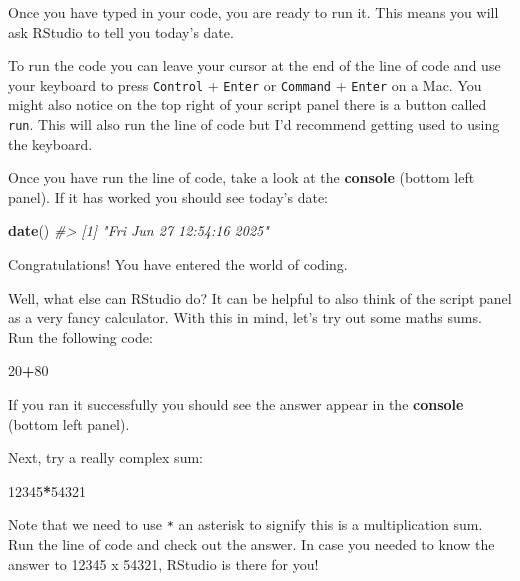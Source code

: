 \documentclass[
]{book}
\newenvironment{Shaded}{\begin{snugshade}}{\end{snugshade}}
\newcommand{\CommentTok}[1]{\textcolor[rgb]{0.56,0.35,0.01}{\textit{#1}}}
\newcommand{\DecValTok}[1]{\textcolor[rgb]{0.00,0.00,0.81}{#1}}
\newcommand{\FunctionTok}[1]{\textcolor[rgb]{0.13,0.29,0.53}{\textbf{#1}}}
\newcommand{\NormalTok}[1]{#1}
\newcommand{\SpecialCharTok}[1]{\textcolor[rgb]{0.81,0.36,0.00}{\textbf{#1}}}
\begin{document}
Once you have typed in your code, you are ready to run it. This means you will ask RStudio to tell you today's date.

To run the code you can leave your cursor at the end of the line of code and use your keyboard to press \texttt{Control} + \texttt{Enter} or \texttt{Command} + \texttt{Enter} on a Mac. You might also notice on the top right of your script panel there is a button called \texttt{run}. This will also run the line of code but I'd recommend getting used to using the keyboard.

\newpage

Once you have run the line of code, take a look at the \textbf{console} (bottom left panel). If it has worked you should see today's date:

\begin{Shaded}
\begin{Highlighting}[]
\FunctionTok{date}\NormalTok{()}
\CommentTok{\#\textgreater{} [1] "Fri Jun 27 12:54:16 2025"}
\end{Highlighting}
\end{Shaded}

Congratulations! You have entered the world of coding.

Well, what else can RStudio do? It can be helpful to also think of the script panel as a very fancy calculator. With this in mind, let's try out some maths sums. Run the following code:

\begin{Shaded}
\begin{Highlighting}[]
\DecValTok{20}\SpecialCharTok{+}\DecValTok{80}
\end{Highlighting}
\end{Shaded}

If you ran it successfully you should see the answer appear in the \textbf{console} (bottom left panel).

Next, try a really complex sum:

\begin{Shaded}
\begin{Highlighting}[]
\DecValTok{12345}\SpecialCharTok{*}\DecValTok{54321}
\end{Highlighting}
\end{Shaded}

Note that we need to use \texttt{*} an asterisk to signify this is a multiplication sum. Run the line of code and check out the answer. In case you needed to know the answer to 12345 x 54321, RStudio is there for you!
\end{document}
